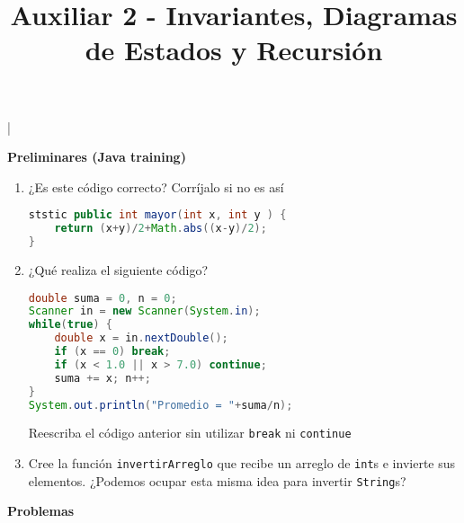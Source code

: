 |\documentclass[dcc]{fcfmcourse}
\title{Auxiliar 2 - Invariantes, Diagramas de Estados y Recursión}
\begin{document}
\maketitle

\vspace{-1ex}

\textbf{Preliminares (Java training)}
\begin{enumerate}
\item ¿Es este código correcto? Corríjalo si no es así
\begin{lstlisting}[language=Java, frame=single]
ststic public int mayor(int x, int y ) {
    return (x+y)/2+Math.abs((x-y)/2);
} 
\end{lstlisting}

\item ¿Qué realiza el siguiente código? 
\begin{lstlisting}[language=Java, frame=single]
double suma = 0, n = 0;
Scanner in = new Scanner(System.in);
while(true) {
    double x = in.nextDouble();
    if (x == 0) break;
    if (x < 1.0 || x > 7.0) continue;
    suma += x; n++;
}
System.out.println("Promedio = "+suma/n);
\end{lstlisting}
Reescriba el código anterior sin utilizar \texttt{break} ni \texttt{continue}



\item Cree la función \texttt{invertirArreglo} que recibe un arreglo de \texttt{int}s e invierte sus elementos. ¿Podemos ocupar esta misma idea para invertir \texttt{String}s?
\end{enumerate}
\vspace{5ex}
\textbf{Problemas}
\end{document}
